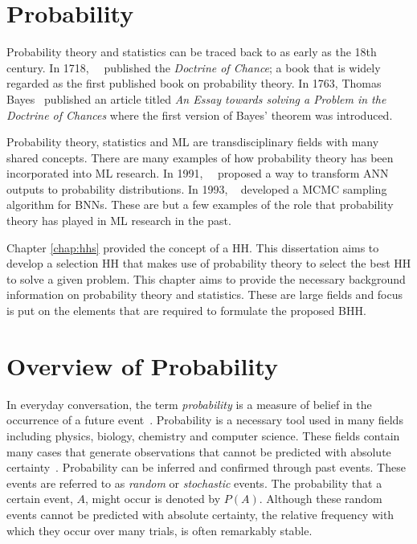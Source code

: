\section{Probability}
\label{sec:probability}

Probability theory and statistics can be traced back to as early as the 18th century. In 1718,~\citeauthor{ref:demoivre:1718}~\cite{ref:demoivre:1718} published the \textit{Doctrine of Chance}; a book that is widely regarded as the first published book on probability theory. In 1763, Thomas Bayes~\cite{ref:bayes:1763} published an article titled \textit{An Essay towards solving a Problem in the Doctrine of Chances} where the first version of Bayes' theorem was introduced.

Probability theory, statistics and \acf{ML} are transdisciplinary fields with many shared concepts. There are many examples of how probability theory has been incorporated into \acs{ML} research. In 1991,~\citeauthor{ref:denker:1991}~\cite{ref:denker:1991} proposed a way to transform \acf{ANN} outputs to probability distributions. In 1993, \citeauthor{ref:neal:1993}~\cite{ref:neal:1993} developed a \acf{MCMC} sampling algorithm for \acfp{BNN}. These are but a few examples of the role that probability theory has played in \acs{ML} research in the past.

Chapter \ref{chap:hhs} provided the concept of a \acf{HH}. This dissertation aims to develop a selection \acs{HH} that makes use of probability theory to select the best \acs{HH} to solve a given problem. This chapter aims to provide the necessary background information on probability theory and statistics. These are large fields and focus is put on the elements that are required to formulate the proposed \acf{BHH}.


\section{Overview of Probability}\label{sec:probability:overview}

In everyday conversation, the term \textit{probability} is a measure of belief in the occurrence of a future event~\cite{ref:wackerly:2014}. Probability is a necessary tool used in many fields including physics, biology, chemistry and computer science. These fields contain many cases that generate observations that cannot be predicted with absolute certainty~\cite{ref:wackerly:2014}. Probability can be inferred and confirmed through past events. These events are referred to as \textit{random} or \textit{stochastic} events. The probability that a certain event, $A$, might occur is denoted by $P(A)$. Although these random events cannot be predicted with absolute certainty, the relative frequency with which they occur over many trials, is often remarkably stable.

